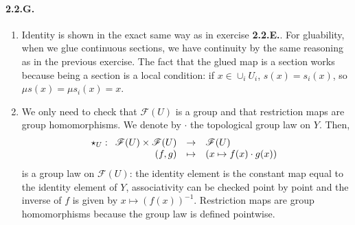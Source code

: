 \documentclass{article}
\newcommand{\applic}[4]{\begin{array}[t]{rcl}
#1 & \to & #2 \\
#3 & \mapsto & #4
\end{array}}
\newcommand{\Fsheaf}{\mathscr{F}}
\begin{document}
\paragraph{2.2.G.} 
\begin{enumerate}
    \item Identity is shown in the exact same way as in exercise \textbf{2.2.E.}. For gluability, when we glue continuous sections, we have continuity by the same reasoning as in the previous exercise. The fact that the glued map is a section works because being a section is a local condition: if $x \in \cup_i U_i$, $s(x) = s_i(x)$, so $\mu s(x) = \mu s_i(x) = x$.
    \item We only need to check that $\Fsheaf (U)$ is a group and that restriction maps are group homomorphisms. We denote by $\cdot$ the topological group law on $Y$. Then, 
    \[\star_U : \applic{\Fsheaf(U) \times \Fsheaf(U)}{\Fsheaf(U)}{(f,g)}{(x \mapsto f(x) \cdot g(x))}\] is a group law on $\Fsheaf(U)$: the identity element is the constant map equal to the identity element of $Y$, associativity can be checked point by point and the inverse of $f$ is given by $x\mapsto (f(x))^{-1}$. Restriction maps are group homomorphisms because the group law is defined pointwise.
\end{enumerate}
\end{document}

